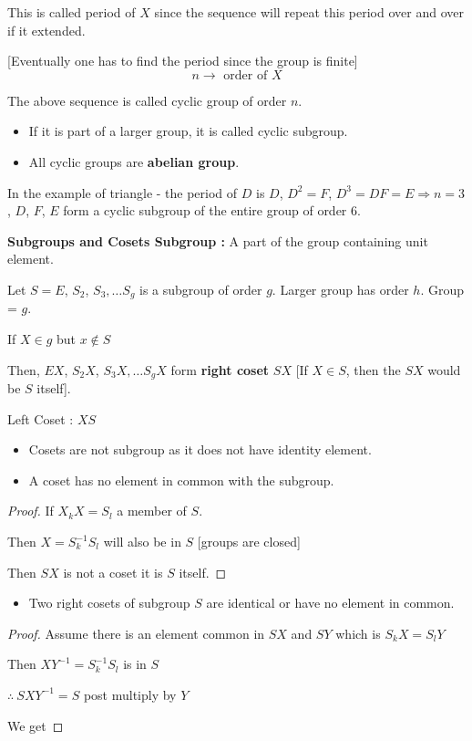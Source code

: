 This is called period of $X$ since the sequence will repeat this period over and over if it extended. 

[Eventually one has to find the period since the group is finite]
$$
n\to \text{ order of } X
$$

The above sequence is called cyclic group of order $n$.
\begin{itemize}
\item If it is part of a larger group, it is called cyclic subgroup.

\item All cyclic groups are {\bf abelian group}.
\end{itemize}

In the example of triangle - the period of $D$ is $D$, $D^{2}=F$, $D^{3}=DF=E\Rightarrow n=3$, $D$, $F$, $E$ form a cyclic subgroup of the entire group of order $6$.

\noindent
{\bf Subgroups and Cosets Subgroup :} A part of the group containing unit element.

Let $S=E$, $S_{2}$, $S_{3},\ldots S_{g}$ is a subgroup of order $g$. Larger group has order $h$. Group = $g$.

If $X\in g$ but $x\not\in S$

Then, $EX$, $S_{2}X$, $S_{3}X,\ldots S_{g}X$ form {\bf right coset} $SX$ [If $X\in S$, then the $SX$ would be $S$ itself].

Left Coset : $XS$
\begin{itemize}
\item Cosets are not subgroup as it does not have identity element.

\item A coset has no element in common with the subgroup. 
\end{itemize}

\begin{proof}
If $X_{k}X=S_{l}$ a member of $S$.

Then $X=S^{-1}_{k}S_{l}$ will also be in $S$ [groups are closed]

Then $SX$ is not a coset it is $S$ itself.
\end{proof}

\begin{itemize}
\item Two right cosets of subgroup $S$ are identical or have no element in common.
\end{itemize}

\begin{proof}
Assume there is an element common in $SX$ and $SY$ which is $S_{k}X=S_{l}Y$

Then $XY^{-1}=S^{-1}_{k}S_{l}$ is in $S$

$\therefore \ SXY^{-1}=S$ post multiply by $Y$

We get 
\end{proof}

